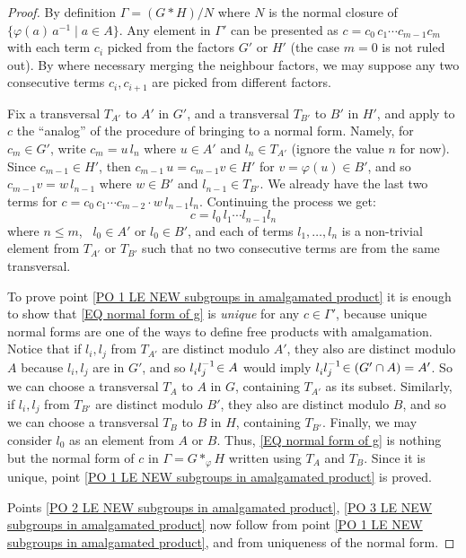 \documentclass[12pt, a4paper]{amsart}
\newcommand{\1}{\{1\}}
\theoremstyle{plain}
\theoremstyle{definition}
\theoremstyle{remark}
\numberwithin{equation}{section}
\begin{document}
\begin{proof}
By definition $\Gamma=(G * H)/N$ where 
$N$ is the normal closure of $\{ \varphi(a)\, a^{-1}\! \mathrel{|} a\in A\}$.
%
Any element in $\Gamma'$ can be presented as 
$c= c_0 \, c_1 \cdots c_{m-1}  c_m$
with each term 
$c_i$ picked from the factors $G'$ or $H'$ (the case $m=0$ is not ruled out). By where necessary merging the neighbour factors, we may suppose any two consecutive  terms $c_i, c_{i+1}$ are picked from different factors.
%

%
Fix a transversal $T_{A'}$ to $A'$ in $G'$, and a transversal $T_{B'}$ to $B'$ in $H'$, and apply to $c$ the ``analog'' of the procedure of bringing to a normal form. Namely,
%
for $c_m \!\!\in G'$, write $c_m = u \, l_n$ where $u \in A'$ and  $l_n  \in T_{A'}$ (ignore the value $n$ for now). 
%
Since $c_{m-1}\!\in H'$, then $c_{m-1}\,u=c_{m-1}  v \in H'$ for $v=\varphi(u)\in B'$, and so  $c_{m-1}  v = w \, l_{n-1}$  where $w \in B'$ and  $l_{n-1}  \in T_{B'}$. 
%
We already have the last two terms for $c= c_0  \,c_1  \cdots c_{m-2}\cdot w\,  l_{n-1} l_n$.
%
Continuing the process we %
get:
\begin{equation}
\label{EQ normal form of g}
c=l_0 \, l_1 \cdots l_{n-1} l_n
\end{equation}
where $n \le m$, \,
$l_0\in A'$ or $l_0\in B'$, and each of terms
$l_1,\ldots, l_n$ is a non-trivial element from $T_{A'}$ or  $T_{B'}$ such that no two consecutive  terms are from the same transversal.

To prove point \eqref{PO 1 LE NEW subgroups in amalgamated product} it is enough to show that \eqref{EQ normal form of g} is \textit{unique} for any $c\in \Gamma'$, because unique normal forms are one of the ways to define free products with amalgamation.
%
Notice that if $l_i, l_j$ from $T_{A'}$ are distinct modulo $A'$, they also are distinct modulo $A$ because $l_i,l_j$ are in $G'$, and so  $l_i^{\vphantom8}  l_j^{-1}\! \in A$ would imply 
$l_i^{\vphantom8}  l_j^{-1}\!\in (G' \cap A) = A'$. 
So we can choose a transversal $T_{A}$ to $A$ in $G$, containing $T_{A'}$ as its subset.
%
Similarly, if $l_i, l_j$ from $T_{B'}$ are distinct modulo $B'$, they also are distinct modulo $B$, and so we can choose a transversal $T_{B}$ to $B$ in $H$, containing $T_{B'}$. 
%
Finally, we may consider $l_0$ as an element from $A$ or $B$.
%
Thus, \eqref{EQ normal form of g} is nothing but the normal form of $c$ in $\Gamma = G *_\varphi H$ written using $T_A$ and $T_B$.
Since it is unique,  point \eqref{PO 1 LE NEW subgroups in amalgamated product} is proved.

Points \eqref{PO 2 LE NEW subgroups in amalgamated product}, \eqref{PO 3 LE NEW subgroups in amalgamated product} now follow from point \eqref{PO 1 LE NEW subgroups in amalgamated product}, and from uniqueness of the normal form.
\end{proof}
\end{document}
